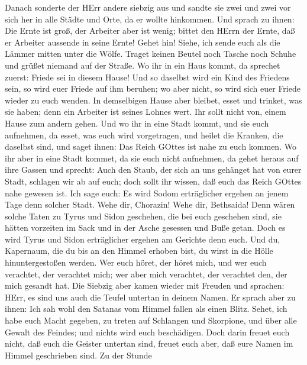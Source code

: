  Danach sonderte der HErr andere siebzig aus und sandte sie
zwei und zwei vor sich her in alle Städte und Orte, da er wollte
hinkommen.  Und sprach zu ihnen: Die Ernte ist groß, der
Arbeiter aber ist wenig; bittet den HErrn der Ernte, daß er Arbeiter
aussende in seine Ernte!  Gehet hin! Siehe, ich sende euch
als die Lämmer mitten unter die Wölfe.  Traget keinen Beutel
noch Tasche noch Schuhe und grüßet niemand auf der Straße. 
Wo ihr in ein Haus kommt, da sprechet zuerst: Friede sei in diesem
Hause!  Und so daselbst wird ein Kind des Friedens sein, so
wird euer Friede auf ihm beruhen; wo aber nicht, so wird sich euer
Friede wieder zu euch wenden.  In demselbigen Hause aber
bleibet, esset und trinket, was sie haben; denn ein Arbeiter ist seines
Lohnes wert. Ihr sollt nicht von, einem Hause zum andern gehen.
 Und wo ihr in eine Stadt kommt, und sie euch aufnehmen, da
esset, was euch wird vorgetragen,  und heilet die Kranken,
die daselbst sind, und saget ihnen: Das Reich GOttes ist nahe zu euch
kommen.  Wo ihr aber in eine Stadt kommet, da sie euch
nicht aufnehmen, da gehet heraus auf ihre Gassen und sprecht:
 Auch den Staub, der sich an uns gehänget hat von eurer
Stadt, schlagen wir ab auf euch; doch sollt ihr wissen, daß euch das
Reich GOttes nahe gewesen ist.  Ich sage euch: Es wird
Sodom erträglicher ergehen an jenem Tage denn solcher Stadt.
 Wehe dir, Chorazin! Wehe dir, Bethsaida! Denn wären solche
Taten zu Tyrus und Sidon geschehen, die bei euch geschehen sind, sie
hätten vorzeiten im Sack und in der Asche gesessen und Buße getan.
 Doch es wird Tyrus und Sidon erträglicher ergehen am
Gerichte denn euch.  Und du, Kapernaum, die du bis an den
Himmel erhoben bist, du wirst in die Hölle hinuntergestoßen werden.
 Wer euch höret, der höret mich, und wer euch verachtet,
der verachtet mich; wer aber mich verachtet, der verachtet den, der mich
gesandt hat.  Die Siebzig aber kamen wieder mit Freuden und
sprachen: HErr, es sind uns auch die Teufel untertan in deinem Namen.
 Er sprach aber zu ihnen: Ich sah wohl den Satanas vom
Himmel fallen als einen Blitz.  Sehet, ich habe euch Macht
gegeben, zu treten auf Schlangen und Skorpione, und über alle Gewalt des
Feindes; und nichts wird euch beschädigen.  Doch darin
freuet euch nicht, daß euch die Geister untertan sind, freuet euch aber,
daß eure Namen im Himmel geschrieben sind.  Zu der Stunde
